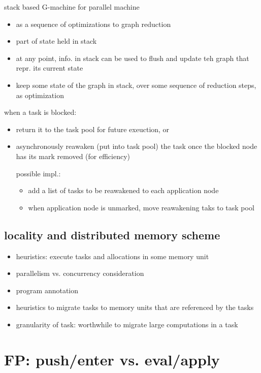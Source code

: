 \documentclass[8pt]{extarticle}
\begin{document}
\begin{multicols*}{2}
stack based G-machine for parallel machine
\begin{itemize}
\item as a sequence of optimizations to graph reduction
\item part of state held in stack
\item at any point, info. in stack can be used to flush and update teh graph that repr. its current state
\item keep some state of the graph in stack, over some sequence of reduction steps, as optimization
\end{itemize}


when a task is blocked:
\begin{itemize}
\item return it to the task pool for future exeuction, or
\item asynchronously reawaken (put into task pool) the task once the blocked node has its mark removed (for efficiency)

  possible impl.:
  \begin{itemize}
  \item add a list of tasks to be reawakened to each application node
  \item when application node is unmarked, move reawakening taks to task pool
  \end{itemize}
\end{itemize}

\subsection{locality and distributed memory scheme}

\begin{itemize}
\item heuristics: execute tasks and allocations in some memory unit
\item parallelism vs. concurrency consideration
\item program annotation
\item heuristics to migrate tasks to memory units that are referenced  by the tasks
\item granularity of task: worthwhile to migrate large computations in a task
\end{itemize}

\vfill\null
\columnbreak

\section{FP: push/enter vs. eval/apply \cite{marlow2004}}


\end{multicols*}
\end{document}
